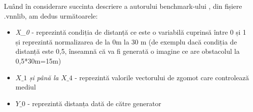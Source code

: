 Luând în considerare succinta descriere a autorului benchmark-ului \cite{vnncomp2023Chat}, din fișiere .vnnlib, am dedus următoarele:

\begin{itemize}
  \item \textit{X\_0} - reprezintă condiția de distanță ce este o variabilă cuprinsă între 0 și 1 și reprezintă normalizarea de la 0m la 30 m (de exemplu dacă condiția de distanță este 0,5, înseamnă că va fi generată o imagine ce are obstacolul la 0,5*30m=15m)
  
  \item \textit{$X\_1$ și până la $X\_4$} - reprezintă valorile vectorului de zgomot care controlează mediul
  
  \item \textit{$Y\_0$}  - reprezintă distanța dată de către generator
  
\end{itemize}